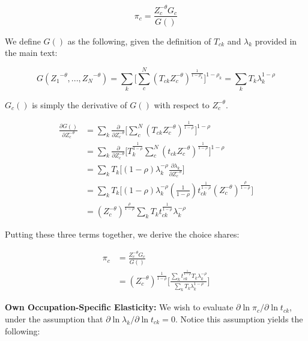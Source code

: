 \documentclass[10pt]{article}
\begin{document}
\begin{equation*}
    \pi_{c}=\frac{Z_{c}^{-\theta}{G_{c}}}{G()}
\end{equation*}

We define $G()$ as the following, given the definition of $T_{ck}$ and $\lambda_{k}$ provided in the main text:

\begin{equation*}
    G({Z_{1}}^{-\theta},...,{Z_{N}}^{-\theta})=\sum\limits_{k}\Big[\sum\limits_{c}^{N}({T_{ck}}{Z_{c}^{-\theta}})^{\frac{1}{1-\rho_{k}}}\Big]^{1-\rho_{k}} = \sum\limits_{k}{T_{k}}\lambda^{1-\rho}_{k}
\end{equation*}

$G_{c}()$ is simply the derivative of $G()$ with respect to $Z_{c}^{-\theta}$.

\begin{align*}
    \frac{\partial{G()}}{\partial{Z_{c}^{-\theta}}} & = \sum\limits_{k}\frac{\partial}{\partial{Z_{c}^{-\theta}}}\Big[\sum\limits_{c}^{N}({T_{ck}}{Z_{c}^{-\theta}})^{\frac{1}{1-\rho}}\Big]^{1-\rho} \\ &= \sum\limits_{k}\frac{\partial}{\partial{Z_{c}^{-\theta}}}\Big[{T^{\frac{1}{1-\rho}}_{k}}\sum\limits_{c}^{N}({t_{ck}}{Z_{c}^{-\theta}})^{\frac{1}{1-\rho}}\Big]^{1-\rho} \\ &= \sum\limits_{k}{T_{k}}\Big[(1-\rho)\lambda^{-\rho}_{k}\frac{\partial{\lambda_{k}}}{\partial{Z_{c}^{-\theta}}}\Big] \\ &= \sum\limits_{k}{T_{k}}\Big[(1-\rho)\lambda^{-\rho}_{k}(\frac{1}{1-\rho}){t^{\frac{1}{1-\rho}}_{ck}}(Z_{c}^{-\theta})^{\frac{\rho}{1-\rho}}\Big]\\ &= (Z_{c}^{-\theta})^{\frac{\rho}{1-\rho}}\sum\limits_{k}{T_{k}}{t^{\frac{1}{1-\rho}}_{ck}}\lambda_{k}^{-\rho}
\end{align*}

Putting these three terms together, we derive the choice shares:

\begin{align*}
    \pi_{c} & = \frac{Z_{c}^{-\theta}{G_{c}}}{G()} \\ &= (Z_{c}^{-\theta})^{\frac{1}{1-\rho}}\Bigg[\frac{\sum\limits_{k}{t^{\frac{1}{1-\rho}}_{ck}}{T_{k}}\lambda_{k}^{-\rho}}{\sum\limits_{k}{T_{k}}\lambda_{k}^{1-\rho}}\Bigg]
\end{align*}

\noindent\textbf{Own Occupation-Specific Elasticity:} We wish to evaluate $\partial\ln{\pi_{c}}/\partial\ln{t_{ck}}$, under the assumption that $\partial\ln{\lambda_{k}}/\partial\ln{t_{ck}}=0$. Notice this assumption yields the following:
\end{document}
